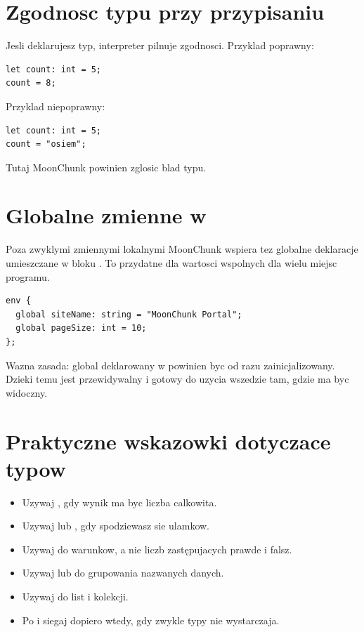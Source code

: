 \section{Zgodnosc typu przy przypisaniu}
Jesli deklarujesz typ, interpreter pilnuje zgodnosci. Przyklad poprawny:

\begin{lstlisting}[style=moonchunk,caption={Zgodne przypisanie typu}]
let count: int = 5;
count = 8;
\end{lstlisting}

Przyklad niepoprawny:

\begin{lstlisting}[style=moonchunk,caption={Niezgodne przypisanie typu}]
let count: int = 5;
count = "osiem";
\end{lstlisting}

Tutaj MoonChunk powinien zglosic blad typu.

\section{Globalne zmienne w }
Poza zwyklymi zmiennymi lokalnymi MoonChunk wspiera tez globalne deklaracje umieszczane
w bloku . To przydatne dla wartosci wspolnych dla wielu miejsc programu.

\begin{lstlisting}[style=moonchunk,caption={Globalne wartosci w bloku env}]
env {
  global siteName: string = "MoonChunk Portal";
  global pageSize: int = 10;
};
\end{lstlisting}

Wazna zasada: global deklarowany w  powinien byc od razu zainicjalizowany.
Dzieki temu jest przewidywalny i gotowy do uzycia wszedzie tam, gdzie ma byc widoczny.

\section{Praktyczne wskazowki dotyczace typow}
\begin{itemize}
  \item Uzywaj , gdy wynik ma byc liczba calkowita.
  \item Uzywaj  lub , gdy spodziewasz sie ulamkow.
  \item Uzywaj  do warunkow, a nie liczb zastępujacych prawde i falsz.
  \item Uzywaj  lub  do grupowania nazwanych danych.
  \item Uzywaj  do list i kolekcji.
  \item Po  i  siegaj dopiero wtedy, gdy zwykle typy nie wystarczaja.
\end{itemize}

